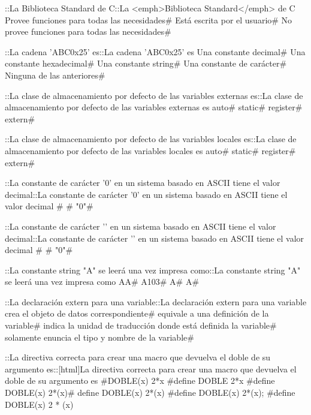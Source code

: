 {{{{{{\question ::La Biblioteca Standard de C::La <emph>Biblioteca Standard</emph> de C
\choice Provee funciones para todas las necesidades# 
\choice Está escrita por el usuario# 
\correctchoice No provee funciones para todas las necesidades# 

\question ::La cadena 'ABC0x25' es::La cadena 'ABC0x25' es
\choice Una constante decimal# 
\choice Una constante hexadecimal# 
\choice Una constante string# 
\choice Una constante de carácter# 
\correctchoice Ninguna de las anteriores# 

\question ::La clase de almacenamiento por defecto de las variables externas es::La clase de almacenamiento por defecto de las variables externas es
\choice auto# 
\correctchoice static# 
\choice register# 
\choice extern# 

\question ::La clase de almacenamiento por defecto de las variables locales es::La clase de almacenamiento por defecto de las variables locales es
\correctchoice auto# 
\choice static# 
\choice register# 
\choice extern# 

\question ::La constante de carácter '0' en un sistema basado en ASCII tiene el valor decimal::La constante de carácter '0' en un sistema basado en ASCII tiene el valor decimal
# 
# 
\choice "0"# 

\question ::La constante de carácter '\0' en un sistema basado en ASCII tiene el valor decimal::La constante de carácter '\0' en un sistema basado en ASCII tiene el valor decimal
# 
# 
\choice "0"# 

\question ::La constante string "A" se leerá una vez impresa como::La constante string "A" se leerá una vez impresa como
\choice AA# 
\choice A103# 
\choice A# 
\correctchoice A# 

\question ::La declaración extern para una variable::La declaración extern para una variable
\choice crea el objeto de datos correspondiente# 
\choice equivale a una definición de la variable# 
\choice indica la unidad de traducción donde está definida la variable# 
\correctchoice solamente enuncia el tipo y nombre de la variable# 

\question ::La directiva correcta para crear una macro que devuelva el doble de su argumento es::[html]La directiva correcta para crear una macro que devuelva el doble de su argumento es
\choice \#DOBLE(x) 2*x
\choice \#define DOBLE 2*x
\correctchoice \#define DOBLE(x) 2*(x)# define DOBLE(x) 2*(x)
\choice \#define DOBLE(x) 2*(x);
\choice \#define DOBLE(x) 2 * (x)

}}}}}}
